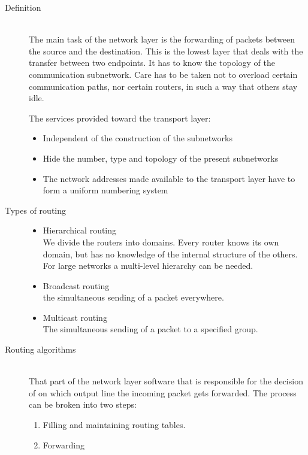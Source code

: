 \documentclass[margin=0px]{article}
\begin{document}
\begin{description}
    \item[Definition] \hfill \\
        The main task of the network layer is the forwarding of packets between the source and the destination. This is the lowest layer that deals with the transfer between two endpoints. It has to know the topology of the communication subnetwork. Care has to be taken not to overload certain communication paths, nor certain routers, in such a way that others stay idle.

        The services provided toward the transport layer:
        \begin{itemize}
            \item Independent of the construction of the subnetworks
            \item Hide the number, type and topology of the present subnetworks
            \item The network addresses made available to the transport layer have to form a uniform numbering system
        \end{itemize}
    \item[Types of routing] \hfill
        \begin{itemize}
            \item Hierarchical routing\\
                  We divide the routers into domains. Every router knows its own domain, but has no knowledge of the internal structure of the others. For large networks a multi-level hierarchy can be needed.
            \item Broadcast routing\\
                  the simultaneous sending of a packet everywhere.
            \item Multicast routing\\
                  The simultaneous sending of a packet to a specified group.

        \end{itemize}

    \item[Routing algorithms] \hfill \\
        That part of the network layer software that is responsible for the decision of on which output line the incoming packet gets forwarded. The process can be broken into two steps:
        \begin{enumerate}
            \item Filling and maintaining routing tables.
            \item Forwarding
        \end{enumerate}


\end{description}
\end{document}
